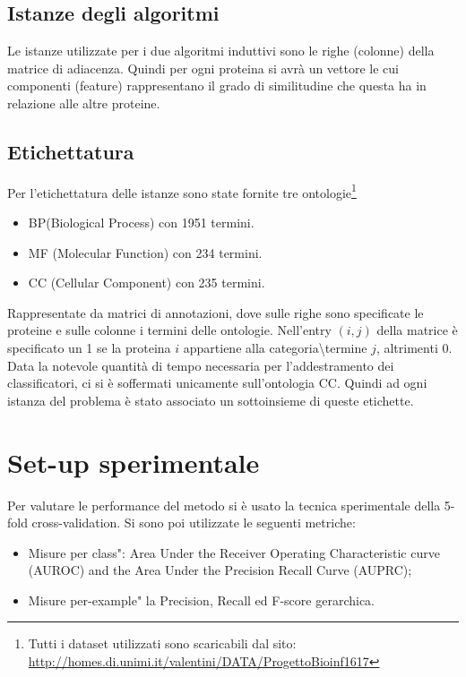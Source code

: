\documentclass{article}
\begin{document}
\subsection{Istanze degli algoritmi}
Le istanze utilizzate per i due algoritmi induttivi sono le righe (colonne) della matrice di adiacenza. Quindi per ogni proteina si avrà un vettore le cui componenti (feature) rappresentano il grado di similitudine che questa ha in relazione alle altre proteine. 

\subsection{Etichettatura}
Per l'etichettatura delle istanze sono state fornite tre ontologie\footnote{Tutti i dataset utilizzati sono scaricabili dal sito:
\url{http://homes.di.unimi.it/valentini/DATA/ProgettoBioinf1617}}
\begin{itemize}
\item BP(Biological Process) con 1951 termini.
\item MF (Molecular Function) con 234 termini.
\item CC (Cellular Component) con 235 termini.
\end{itemize} 
Rappresentate da matrici di annotazioni, dove sulle righe sono specificate le proteine e sulle colonne i termini delle ontologie. Nell'entry $(i,j)$ della matrice è specificato un 1 se la proteina $i$ appartiene alla categoria\textbackslash termine $j$, altrimenti 0.
\newline
\newline
Data la notevole quantità di tempo necessaria per l'addestramento dei classificatori, ci si è soffermati unicamente sull'ontologia CC. Quindi ad ogni istanza del problema è stato associato un sottoinsieme di queste etichette.


\section{Set-up sperimentale}

Per valutare le performance del metodo si è usato la tecnica sperimentale della 5-fold
cross-validation.  Si sono poi utilizzate le seguenti metriche:

\begin{itemize}
\item Misure per  class":   Area  Under  the  Receiver  Operating  Characteristic
curve (AUROC) and the Area Under the Precision Recall Curve (AUPRC);
\item Misure per-example" la Precision, Recall ed F-score gerarchica.
\end{itemize}






\end{document}
